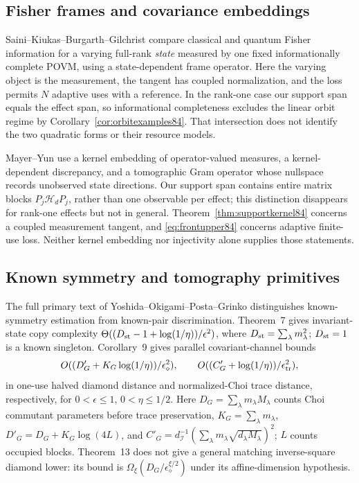 \subsection{Fisher frames and covariance embeddings}
Saini--Kiukas--Burgarth--Gilchrist \cite[Theorem~1]{SKBG84} compare
classical and quantum Fisher information for a varying full-rank
\emph{state} measured by one fixed informationally complete POVM,
using a state-dependent frame operator.  Here the varying object
is the measurement, the tangent has coupled normalization, and the
loss permits $N$ adaptive uses with a reference.  In the rank-one
case our support span equals the effect span, so informational
completeness excludes the linear orbit regime by
Corollary~\ref{cor:orbitexamples84}.  That intersection does not
identify the two quadratic forms or their resource models.

Mayer--Yun \cite[Theorem~3.6, Definition~3.7 and Remark~4.4]{MY84}
use a kernel embedding of operator-valued measures, a kernel-dependent
discrepancy, and a tomographic Gram operator whose nullspace records
unobserved state directions.  Our support span contains entire
matrix blocks $P_j\mathcal H_dP_j$, rather than one observable
per effect; this distinction disappears for rank-one effects but
not in general.  Theorem~\ref{thm:supportkernel84} concerns a
coupled measurement tangent, and \eqref{eq:frontupper84} concerns
adaptive finite-use loss.  Neither kernel embedding nor injectivity
alone supplies those statements.

\subsection{Known symmetry and tomography primitives}
The full primary text of Yoshida--Okigami--Posta--Grinko
\cite{YOPG84} distinguishes known-symmetry estimation from known-pair
discrimination.  Theorem~7 gives invariant-state copy complexity
$\Theta((D_{\rm st}-1+\log(1/\eta))/\epsilon^2)$, where
$D_{\rm st}=\sum_\lambda m_\lambda^2$; $D_{\rm st}=1$ is a
known singleton.  Corollary~9 gives parallel covariant-channel bounds
\[
 O((D'_G+K_G\log(1/\eta))/\epsilon_\diamond^2),\qquad
 O((C'_G+\log(1/\eta))/\epsilon_{\rm tr}^2),
\]
in one-use halved diamond distance and normalized-Choi trace distance,
respectively, for $0<\epsilon\le1$, $0<\eta\le1/2$.
Here $D_G=\sum_\lambda m_\lambda M_\lambda$ counts Choi commutant
parameters before trace preservation,
$K_G=\sum_\lambda m_\lambda$,
$D'_G=D_G+K_G\log(4L)$, and
$C'_G=d_{\mathcal I}^{-1}(\sum_\lambda m_\lambda
\sqrt{d_\lambda M_\lambda})^2$; $L$ counts occupied blocks.
Theorem~13 does not give a general matching inverse-square diamond
lower: its bound is $\Omega_\xi(D_G/\epsilon_\diamond^{\xi/2})$
under its affine-dimension hypothesis.

